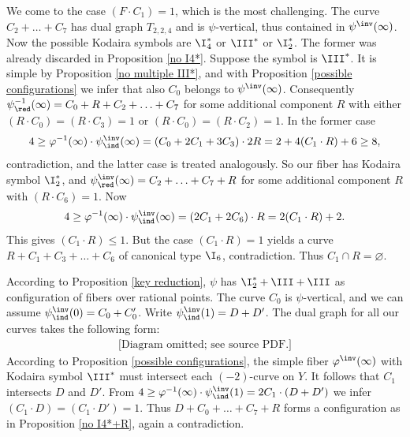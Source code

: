 We come to  the case $(F\cdot C_1)=1$, which is the most challenging.
The curve $C_2+\ldots+C_7$ has dual graph $T_{2,2,4}$ and is $\psi$-vertical, thus contained in $\psi^\inv(\infty)$.
Now the possible Kodaira symbols are  $\I_4^*$ or $\III^*$  or $\I_2^*$.
The former was already discarded in  Proposition \ref{no I4*}.
Suppose the symbol is $\III^*$.  It is simple by Proposition \ref{no multiple III*},
and with Proposition \ref{possible configurations} we infer that
also $C_0$ belongs to $\psi^\inv(\infty)$. Consequently  $\psi_\red^{-1}(\infty)=C_0+R+C_2+\ldots+C_7$ for some additional component $R$
with either $(R\cdot C_0)=(R\cdot C_3)=1$ or $(R\cdot C_0)=(R\cdot C_2)=1$.  In the former case
$$
4\geq \varphi^{-1}(\infty)\cdot \psi^\inv_\ind(\infty) = (C_0+2C_1+3C_3)\cdot 2R = 2 + 4(C_1\cdot R) + 6\geq 8,
$$
contradiction, and the latter case is treated analogously. So our fiber has Kodaira symbol $\I_2^*$,
and $\psi^\inv_\red(\infty)=C_2+\ldots+C_7+R$ for some additional component $R$ with $(R\cdot C_6)=1$. Now
$$
4\geq \varphi^{-1}(\infty)\cdot \psi^\inv_\ind(\infty) = (2C_1+ 2C_6)\cdot R = 2(C_1\cdot R) + 2.
$$
This gives $(C_1\cdot R)\leq 1$. But the case $(C_1\cdot R)=1$ yields a curve $R+C_1+C_3+\ldots+C_6$ of canonical type $\I_6$,
contradiction. Thus $C_1\cap R=\varnothing$.

According to Proposition \ref{key reduction}, $\psi$ has $\I_2^*+\III+\III$
as  configuration of fibers over rational points. The curve $C_0$ is $\psi$-vertical, and
we can assume $\psi^\inv_\ind(0)=C_0+C_0'$. Write $\psi^\inv_\ind(1)=D+D'$.
The dual graph for all our curves takes the following form:
\begin{equation*}
\begin{gathered}
\text{[Diagram omitted; see source PDF.]}
\end{gathered}
\end{equation*}
According to Proposition \ref{possible configurations}, the simple fiber $\varphi^\inv(\infty)$ with Kodaira symbol $\III^*$
must intersect each $(-2)$-curve on $Y$. It follows that  $C_1$ intersects $D$ and $D'$.
From
$4\geq \varphi^{-1}(\infty)\cdot \psi^\inv_\ind(1) = 2C_1\cdot (D+D')$
we infer $(C_1\cdot D)=(C_1\cdot D')=1$. Thus $D+C_0+\ldots+C_7+R$ forms a configuration as in Proposition \ref{no I4*+R},
again a contradiction.

